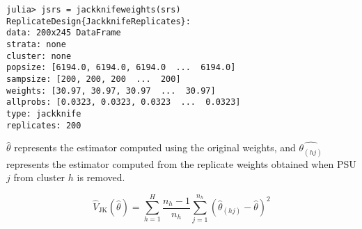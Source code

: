 \documentclass{juliacon}
\begin{document}
\begin{lstlisting}
julia> jsrs = jackknifeweights(srs)
ReplicateDesign{JackknifeReplicates}:
data: 200x245 DataFrame
strata: none
cluster: none
popsize: [6194.0, 6194.0, 6194.0  ...  6194.0]
sampsize: [200, 200, 200  ...  200]
weights: [30.97, 30.97, 30.97  ...  30.97]
allprobs: [0.0323, 0.0323, 0.0323  ...  0.0323]
type: jackknife
replicates: 200
\end{lstlisting}

$\hat{\theta}$ represents the estimator computed using the original weights, and $\hat{\theta_{(hj)}}$ represents the estimator computed from the replicate weights obtained when PSU $j$ from cluster $h$ is removed.

\begin{equation}
\hat{V}_{\text{JK}}(\hat{\theta}) = \sum_{h = 1}^H \dfrac{n_h - 1}{n_h}\sum_{j = 1}^{n_h}(\hat{\theta}_{(hj)} - \hat{\theta})^2
\end{equation}





\end{document}
